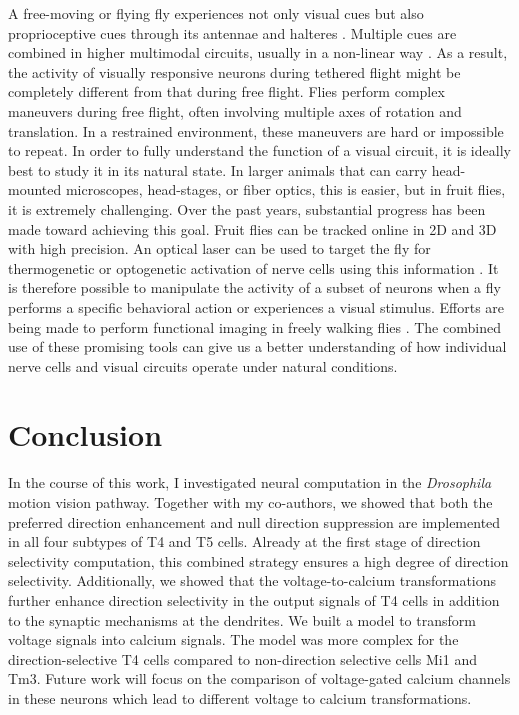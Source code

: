 A free-moving or flying fly experiences not only visual cues but also proprioceptive cues through its antennae and halteres \parencite{Mamiya2011, Sandeman1980}. Multiple cues are combined in higher multimodal circuits, usually in a non-linear way \parencite{Haag2010, Huston2009}. As a result, the activity of visually responsive neurons during tethered flight might be completely different from that during free flight. Flies perform complex maneuvers during free flight, often involving multiple axes of rotation and translation. In a restrained environment, these maneuvers are hard or impossible to repeat. In order to fully understand the function of a visual circuit, it is ideally best to study it in its natural state. In larger animals that can carry head-mounted microscopes, head-stages, or fiber optics, this is easier, but in fruit flies, it is extremely challenging. Over the past years, substantial progress has been made toward achieving this goal. Fruit flies can be tracked online in 2D and 3D with high precision. An optical laser can be used to target the fly for thermogenetic or optogenetic activation of nerve cells using this information \parencite{Bath2014, Stowers2014, Straw2011}. It is therefore possible to manipulate the activity of a subset of neurons when a fly performs a specific behavioral action or experiences a visual stimulus. Efforts are being made to perform functional imaging in freely walking flies \parencite{Grover2016}. The combined use of these promising tools can give us a better understanding of how individual nerve cells and visual circuits operate under natural conditions.

\section{Conclusion}
In the course of this work, I investigated neural computation in the \textit{Drosophila} motion vision pathway. Together with my co-authors, we showed that both the preferred direction enhancement and null direction suppression are implemented in all four subtypes of T4 and T5 cells. Already at the first stage of direction selectivity computation, this combined strategy ensures a high degree of direction selectivity. Additionally, we showed that the voltage-to-calcium transformations further enhance direction selectivity in the output signals of T4 cells in addition to the synaptic mechanisms at the dendrites. We built a model to transform voltage signals into calcium signals. The model was more complex for the direction-selective T4 cells compared to non-direction selective cells Mi1 and Tm3. Future work will focus on the comparison of voltage-gated calcium channels in these neurons which lead to different voltage to calcium transformations.



